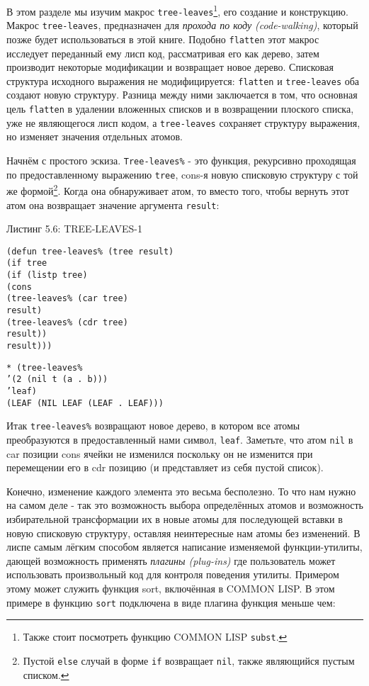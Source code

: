 В этом разделе мы изучим макрос \verb"tree-leaves"\footnote{Также стоит посмотреть функцию COMMON LISP \verb"subst".}, его создание и конструкцию. Макрос \verb"tree-leaves", предназначен для \emph{прохода по коду (code-walking)}, который позже будет использоваться в этой книге. Подобно \verb"flatten" этот макрос исследует переданный ему лисп код, рассматривая его как дерево, затем производит некоторые модификации и возвращает новое дерево. Списковая структура исходного выражения не модифицируется: \verb"flatten" и \verb"tree-leaves" оба создают новую структуру. Разница между ними заключается в том, что основная цель \verb"flatten" в удалении вложенных списков и в возвращении плоского списка, уже не являющегося лисп кодом, а \verb"tree-leaves" сохраняет структуру выражения, но изменяет значения отдельных атомов.



Начнём с простого эскиза. \verb"Tree-leaves%" - это функция, рекурсивно проходящая по предоставленному выражению \verb"tree", cons-я новую списковую структуру с той же формой\footnote{Пустой \verb"else" случай в форме \verb"if" возвращает \verb"nil", также являющийся пустым списком.}. Когда она обнаруживает атом, то вместо того, чтобы вернуть этот атом она возвращает значение аргумента \verb"result":

Листинг 5.6: TREE-LEAVES-1\label{listing_5.6}
\listbegin
\begin{verbatim}
(defun tree-leaves% (tree result)
(if tree
(if (listp tree)
(cons
(tree-leaves% (car tree)
result)
(tree-leaves% (cdr tree)
result))
result)))
\end{verbatim}
\listend

\begin{verbatim}
* (tree-leaves%
’(2 (nil t (a . b)))
’leaf)
(LEAF (NIL LEAF (LEAF . LEAF)))
\end{verbatim}

Итак \verb"tree-leaves%" возвращают новое дерево, в котором все атомы преобразуются в предоставленный нами символ, \verb"leaf". Заметьте, что атом \verb"nil" в car позиции cons ячейки не изменился поскольку он не изменится при перемещении его в cdr позицию (и представляет из себя пустой список).

Конечно, изменение каждого элемента это весьма бесполезно. То что нам нужно на самом деле - так это возможность выбора определённых атомов и возможность избирательной трансформации их в новые атомы для последующей вставки в новую списковую структуру, оставляя неинтересные нам атомы без изменений. В лиспе самым лёгким способом является написание изменяемой функции-утилиты, дающей возможность применять \emph{плагины (plug-ins)} где пользователь может использовать произвольный код для контроля поведения утилиты. Примером этому может служить функция sort, включённая в COMMON LISP. В этом примере в функцию \verb"sort" подключена в виде плагина функция меньше чем:


